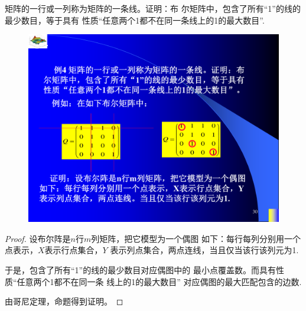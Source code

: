 \begin{example}
	矩阵的一行或一列称为矩阵的一条线。证明：布
	尔矩阵中，包含了所有“1”的线的最少数目，等于具有
	性质“任意两个1都不在同一条线上的1的最大数目”.
\end{example}
\begin{figure}[H]
	\small
	\centering 
	\includegraphics[scale=0.9]{image/CH5_233.pdf}  
	\label{fikgkjjj1KKk}  
\end{figure}
\begin{proof}
	设布尔阵是$n$行$m$列矩阵，把它模型为一个偶图
	如下：每行每列分别用一个点表示，$X$表示行点集合，$Y$
	表示列点集合，两点连线，当且仅当该行该列元为1.
	
	于是，包含了所有“1”的线的最少数目对应偶图中的
	最小点覆盖数。而具有性质“任意两个1都不在同一条
	线上的1的最大数目” 对应偶图的最大匹配包含的边数.
	
	由哥尼定理，命题得到证明。
\end{proof}






